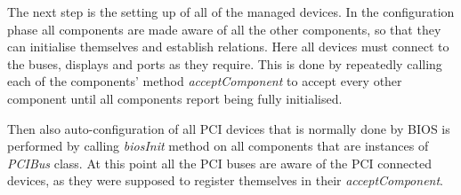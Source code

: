 The next step is the setting up of all of the managed devices. In the
configuration phase all components are made aware of all the other components,
so that they can initialise themselves and establish relations. Here all
devices must connect to the buses, displays and ports as they require. This is
done by repeatedly calling each of the components' method \emph{acceptComponent} to
accept every other component until all components report being fully
initialised.

\begin{codeblock}
    
\end{codeblock}
            
%
%

Then also auto-configuration of all PCI devices that is normally done by BIOS
is performed by calling \emph{biosInit} method on all components that are
instances of \emph{PCIBus} class. At this point all the PCI buses are aware of
the PCI connected devices, as they were supposed to register themselves in their
\emph{acceptComponent}.

\begin{codeblock}
    
\end{codeblock}

